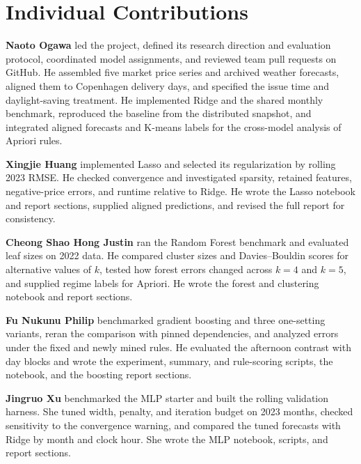 \section{Individual Contributions}
\textbf{Naoto Ogawa} led the project, defined its research direction and
evaluation protocol, coordinated model assignments, and reviewed team
pull requests on GitHub. He assembled five market price series and archived
weather forecasts, aligned them to Copenhagen delivery days, and specified
the issue time and daylight-saving treatment. He implemented Ridge and
the shared monthly benchmark, reproduced the baseline from the distributed
snapshot, and integrated aligned forecasts and K-means labels for the
cross-model analysis of Apriori rules.

\textbf{Xingjie Huang} implemented Lasso and selected its regularization
by rolling 2023 RMSE. He checked convergence and investigated sparsity,
retained features, negative-price errors, and runtime relative to
Ridge. He wrote the Lasso notebook and report sections, supplied
aligned predictions, and revised the full report for consistency.

\textbf{Cheong Shao Hong Justin} ran the Random Forest
benchmark and evaluated leaf sizes on 2022 data. He compared
cluster sizes and Davies--Bouldin scores for alternative values of
\(k\), tested how forest errors changed across \(k=4\) and \(k=5\),
and supplied regime labels for Apriori. He wrote the forest and
clustering notebook and report sections.

\textbf{Fu Nukunu Philip} benchmarked gradient boosting and three
one-setting variants, reran the comparison with pinned dependencies,
and analyzed errors under the fixed and newly mined rules. He
evaluated the afternoon contrast with day blocks and wrote the
experiment, summary, and rule-scoring scripts, the notebook,
and the boosting report sections.

\textbf{Jingruo Xu} benchmarked the MLP starter and built the rolling
validation harness. She tuned width, penalty, and iteration budget on
2023 months, checked sensitivity to the convergence warning, and
compared the tuned forecasts with Ridge by month and clock hour.
She wrote the MLP notebook, scripts, and report sections.
